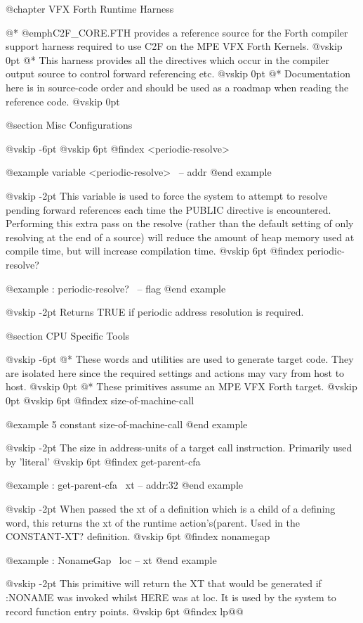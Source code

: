 
@chapter VFX Forth Runtime Harness

@*
@emph{C2F_CORE.FTH} provides a reference source for the Forth compiler
support harness required to use C2F on the MPE VFX Forth Kernels.
@vskip 0pt
@*
This harness provides all the directives which occur in the
compiler output source to control forward referencing etc.
@vskip 0pt
@*
Documentation here is in source-code order and should be used as
a roadmap when reading the reference code.
@vskip 0pt

@section Misc Configurations


@vskip -6pt
@vskip 6pt
@findex <periodic-resolve>

@example
variable <periodic-resolve>     \ -- addr @end example

@vskip -2pt
This variable is used to force the system to attempt to resolve
pending forward references each time the PUBLIC directive is
encountered. Performing this extra pass on the resolve (rather than
the default setting of only resolving at the end of a source) will
reduce the amount of heap memory used at compile time, but will
increase compilation time.
@vskip 6pt
@findex periodic-resolve?

@example
: periodic-resolve?     \ -- flag @end example

@vskip -2pt
Returns TRUE if periodic address resolution is required.

@section CPU Specific Tools


@vskip -6pt
@*
These words and utilities are used to generate target code. They
are isolated here since the required settings and actions may
vary from host to host.
@vskip 0pt
@*
These primitives assume an MPE VFX Forth target.
@vskip 0pt
@vskip 6pt
@findex size-of-machine-call

@example
5 constant size-of-machine-call @end example

@vskip -2pt
The size in address-units of a target call instruction. Primarily
used by 'literal'
@vskip 6pt
@findex get-parent-cfa

@example
: get-parent-cfa        \ xt -- addr:32 @end example

@vskip -2pt
When passed the xt of a definition which is a child of a defining
word, this returns the xt of the runtime action's(parent. Used
in the CONSTANT-XT? definition.
@vskip 6pt
@findex nonamegap

@example
: NonameGap     \ loc -- xt @end example

@vskip -2pt
This primitive will return the XT that would be generated if
:NONAME was invoked whilst HERE was at loc. It is used by the
system to record function entry points.
@vskip 6pt
@findex lp@@

